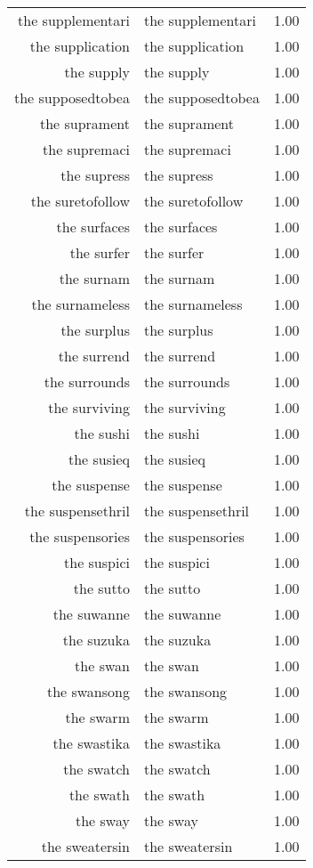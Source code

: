 \begin{table}[ht]
\begin{tabular}{rlr}
  the supplementari & the supplementari & 1.00 \\ 
  the supplication & the supplication & 1.00 \\ 
  the supply & the supply & 1.00 \\ 
  the supposedtobea & the supposedtobea & 1.00 \\ 
  the suprament & the suprament & 1.00 \\ 
  the supremaci & the supremaci & 1.00 \\ 
  the supress & the supress & 1.00 \\ 
  the suretofollow & the suretofollow & 1.00 \\ 
  the surfaces & the surfaces & 1.00 \\ 
  the surfer & the surfer & 1.00 \\ 
  the surnam & the surnam & 1.00 \\ 
  the surnameless & the surnameless & 1.00 \\ 
  the surplus & the surplus & 1.00 \\ 
  the surrend & the surrend & 1.00 \\ 
  the surrounds & the surrounds & 1.00 \\ 
  the surviving & the surviving & 1.00 \\ 
  the sushi & the sushi & 1.00 \\ 
  the susieq & the susieq & 1.00 \\ 
  the suspense & the suspense & 1.00 \\ 
  the suspensethril & the suspensethril & 1.00 \\ 
  the suspensories & the suspensories & 1.00 \\ 
  the suspici & the suspici & 1.00 \\ 
  the sutto & the sutto & 1.00 \\ 
  the suwanne & the suwanne & 1.00 \\ 
  the suzuka & the suzuka & 1.00 \\ 
  the swan & the swan & 1.00 \\ 
  the swansong & the swansong & 1.00 \\ 
  the swarm & the swarm & 1.00 \\ 
  the swastika & the swastika & 1.00 \\ 
  the swatch & the swatch & 1.00 \\ 
  the swath & the swath & 1.00 \\ 
  the sway & the sway & 1.00 \\ 
  the sweatersin & the sweatersin & 1.00 \\ 

\end{tabular}
\end{table}
